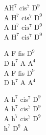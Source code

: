\begin{chord}
    A$\mathrm{H^7}$ $\mathrm{cis^7}$ $\mathrm{D^9}$\\
    A $\mathrm{H^7}$ $\mathrm{cis^7}$ $\mathrm{D^9}$\\
    A $\mathrm{H^7}$ $\mathrm{cis^7}$ $\mathrm{D^9}$\\
    A $\mathrm{H^7}$ $\mathrm{cis^7}$ $\mathrm{D^9}$

    A F fis $\mathrm{D^9}$\\
    D $\mathrm{h^7}$ A $\mathrm{A^4}$\\
    A F fis $\mathrm{D^9}$\\
    D $\mathrm{h^7}$ A $\mathrm{A^4}$

    A $\mathrm{h^7}$ $\mathrm{cis^7}$ $\mathrm{D^9}$\\
    A $\mathrm{h^7}$ $\mathrm{cis^7}$ $\mathrm{D^9}$\\
    A $\mathrm{h^7}$ $\mathrm{cis^7}$ $\mathrm{D^9}$\\
    $\mathrm{h^7}$ $\mathrm{D^9}$ A
\end{chord}
